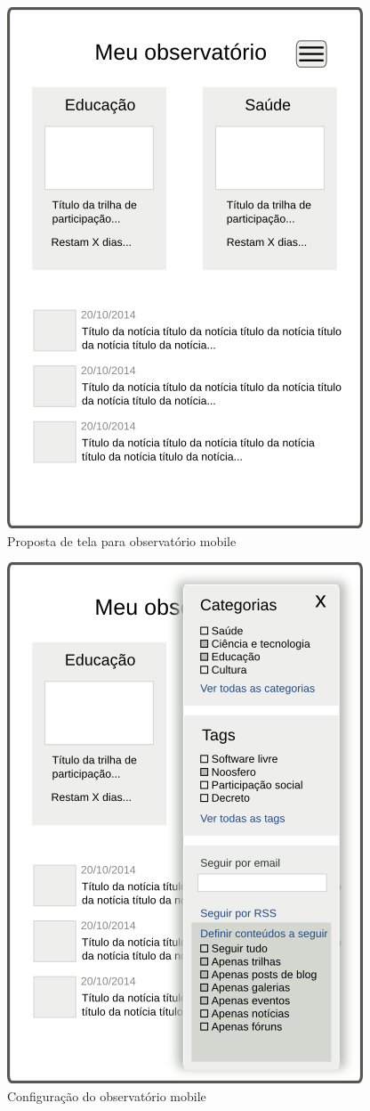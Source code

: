 \documentclass[12pt]{article}
\begin{document}
\begin{figure}[h]
\center
\includegraphics[scale=0.60]{observatorio-mobile.png}
\caption{Proposta de tela para observatório mobile}
\label{observatorio-mobile}
\end{figure}

\begin{figure}[h]
\center
\includegraphics[scale=0.60]{observatorio-mobile-opcoes.png}
\caption{Configuração do observatório mobile}
\label{observatorio-mobile-opcoes}
\end{figure}
\end{document}
